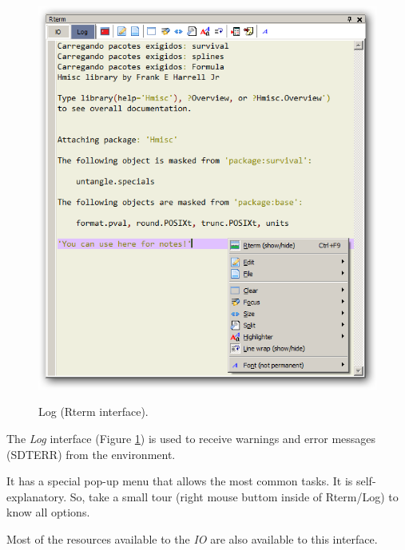  \begin{figure}[h!]
  \includegraphics[scale=0.35]{./res/rterm_log.png}\\
  \caption{Log (Rterm interface).}
  \label{fig:rterm_log}
\end{figure}

The \textit{Log} interface
(Figure \ref{fig:rterm_log})
is used to receive warnings and error messages (SDTERR) from the \RR{} environment.

It has a special pop-up menu that allows the most common tasks. It is
self-explanatory. So, take a small tour (right mouse buttom inside of
Rterm/Log) to know all options.

Most of the resources available to the \textit{IO} are also available to this
interface.
